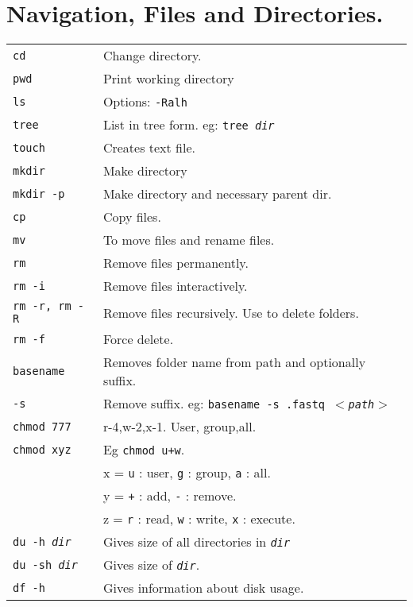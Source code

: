 \section{Navigation, Files and Directories.}

\begin{tabularx}{\linewidth}{lX}
    \texttt{cd} & Change directory.\\
    \texttt{pwd} & Print working directory\\
    \texttt{ls} & Options: \texttt{-Ralh} \\
    \texttt{tree} & List in tree form. eg: \texttt{tree \textit{dir}}\\

    \texttt{touch} & Creates text file. \\
    \texttt{mkdir} & Make directory\\
    \texttt{mkdir -p} & Make directory and necessary parent dir.\\
    \texttt{cp} & Copy files.\\
    \texttt{mv} & To move files and rename files.\\
    \texttt{rm} & Remove files permanently. \\
    \texttt{rm -i} & Remove files interactively. \\
    \texttt{rm -r, rm -R} & Remove files recursively. Use to delete folders.\\
    \texttt{rm -f} & Force delete.\\
    \texttt{basename} & Removes folder name from path and optionally  suffix.\\
    \texttt{-s} & Remove suffix. eg: \texttt{basename -s .fastq $<$\textit{path}$>$}\\
    \texttt{chmod 777} & r-4,w-2,x-1. User, group,all.  \\
    \texttt{chmod xyz} & Eg \texttt{chmod u+w}.\\
    & x = \texttt{u} : user, \texttt{g} : group, \texttt{a} : all.\\
    & y = \texttt{+} : add, \texttt{-} : remove.\\
    & z = \texttt{r} : read, \texttt{w} : write, \texttt{x} : execute.\\

    \texttt{du -h \textit{dir}} & Gives size of all directories in \texttt{\textit{dir}}\\
    \texttt{du -sh \textit{dir}} & Gives size of \texttt{\textit{dir}}.\\
    \texttt{df -h} & Gives information about disk usage.\\
    

\end{tabularx}
